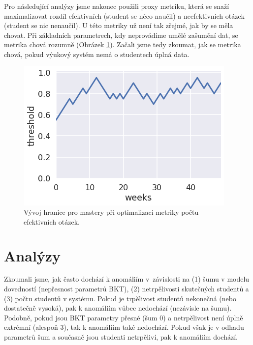 \documentclass[twocolumn,10pt,cleanfoot]{asme2ej}
\begin{document}
Pro následující analýzy jsme nakonec použili proxy metriku, která se snaží maximalizovat rozdíl efektivních (student se něco naučil) a neefektivních otázek (student se nic nenaučil).
U této metriky už není tak zřejmé, jak by se měla chovat. Při základních parametrech, kdy neprovádíme umělé zašumění dat, se metrika chová rozumně
(Obrázek \ref{fig:thresholds-effective-tasks}).
Začali jsme tedy zkoumat, jak se metrika chová, pokud výukový systém nemá o studentech úplná data.

\begin{figure}[htb]
\centering
\includegraphics[width=\columnwidth]{img/thresholds-effective-tasks}
\caption{Vývoj hranice pro mastery při optimalizaci metriky počtu efektivních otázek.}
\label{fig:thresholds-effective-tasks}
\end{figure}

\section{Analýzy}

Zkoumali jsme, jak často dochází k anomáliím v~závislosti na (1) šumu v modelu dovedností (nepřesnost parametrů BKT), (2) netrpělivosti skutečných studentů a (3) počtu studentů v systému. Pokud je trpělivost studentů nekonečná (nebo dostatečně vysoká), pak k anomáliím vůbec nedochází (nezávisle na šumu). Podobně, pokud jsou BKT parametry přesné (šum 0) a netrpělivost není úplně extrémní (alespoň 3), tak k anomáliím také nedochází. Pokud však je v odhadu parametrů šum a současně jsou studenti netrpěliví, pak k anomáliím dochází.
\end{document}
